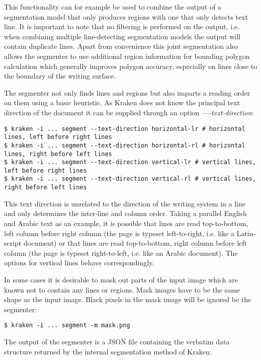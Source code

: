 This functionality can for example be used to combine the output of a
segmentation model that only produces regions with one that only detects text
line. It is important to note that no filtering is performed on the output,
i.e. when combining multiple line-detecting segmentation models the output will
contain duplicate lines. Apart from convenience this joint segmentation also
allows the segmenter to use additional region information for bounding polygon
calculation which generally improves polygon accuracy, especially on lines
close to the boundary of the writing surface.

The segmenter not only finds lines and regions but also imparts a reading order
on them using a basic heuristic. As Kraken does not know the principal text
direction of the document it can be supplied through an option
\emph{----text-direction}: 

\begin{verbatim}
$ kraken -i ... segment --text-direction horizontal-lr # horizontal lines, left before right lines
$ kraken -i ... segment --text-direction horizontal-rl # horizontal lines, right before left lines
$ kraken -i ... segment --text-direction vertical-lr # vertical lines, left before right lines
$ kraken -i ... segment --text-direction vertical-rl # vertical lines, right before left lines
\end{verbatim}

This text direction is unrelated to the direction of the writing system in a
line and only determines the inter-line and column order. Taking a parallel
English and Arabic text as an example, it is possible that lines are read
top-to-bottom, left column before right column (the page is typeset
left-to-right, i.e. like a Latin-script document) or that lines are read
top-to-bottom, right column before left column (the page is typeset
right-to-left, i.e. like an Arabic document). The options for vertical lines
behave correspondingly.

In some cases it is desirable to mask out parts of the input image which are
known not to contain any lines or regions. Mask images have to be the same
shape as the input image. Black pixels in the mask image will be ignored be the
segmenter:

\begin{verbatim}
$ kraken -i ... segment -m mask.png
\end{verbatim}

The output of the segmenter is a JSON file containing the verbatim data
structure returned by the internal segmentation method of Kraken:

